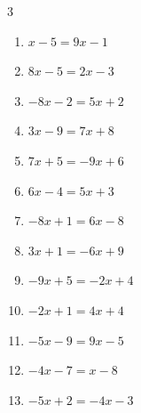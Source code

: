 \begin{multicols}{3}
\begin{enumerate}
        \phantom{$\displaystyle x=2$}

  \item $x-5=9x-1$


\columnbreak %

  \item $8x-5=2x-3$


  \item $-8x-2=5x+2$


  \item $3x-9=7x+8$


  \item $7x+5=-9x+6$


  \item $6x-4=5x+3$

        \phantom{$\displaystyle x=7$}

  \item $-8x+1=6x-8$


  \item $3x+1=-6x+9$


  \item $-9x+5=-2x+4$


  \item $-2x+1=4x+4$


  \item $-5x-9=9x-5$


  \item $-4x-7=x-8$


  \item $-5x+2=-4x-3$

        \phantom{$\displaystyle x=5$}


\end{enumerate}
\end{multicols}
